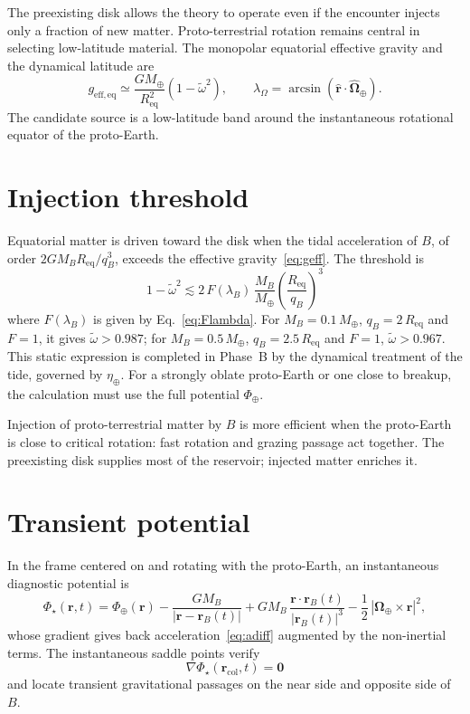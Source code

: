 \documentclass[11pt,a4paper,openany]{report}
\newcommand{\Mt}{M_{\oplus}}
\newcommand{\Req}{R_{\mathrm{eq}}}
\begin{document}
The preexisting disk allows the theory to operate even if the encounter injects only a fraction of
new matter. Proto-terrestrial rotation remains central in selecting low-latitude material. The
monopolar equatorial effective gravity and the dynamical latitude are
\begin{equation}
g_{\mathrm{eff,eq}}\simeq\frac{G\Mt}{\Req^2}\left(1-\tilde\omega^2\right),
\qquad
\lambda_\Omega=\arcsin\!\left(\hat{\mathbf{r}}\cdot\hat{\boldsymbol{\Omega}}_\oplus\right).
\label{eq:geff}
\end{equation}
The candidate source is a low-latitude band around the instantaneous rotational equator of the
proto-Earth.

\section{Injection threshold}

Equatorial matter is driven toward the disk when the tidal acceleration of $B$, of order
$2GM_B\Req/q_B^3$, exceeds the effective gravity~\eqref{eq:geff}. The threshold is
\begin{equation}
\boxed{\;1-\tilde\omega^2\lesssim
2\,F(\lambda_B)\,\frac{M_B}{\Mt}\left(\frac{\Req}{q_B}\right)^3\;}
\label{eq:seuil}
\end{equation}
where $F(\lambda_B)$ is given by Eq.~\eqref{eq:Flambda}. For $M_B=0.1\,\Mt$,
$q_B=2\,\Req$ and $F=1$, it gives $\tilde\omega>0.987$; for $M_B=0.5\,\Mt$,
$q_B=2.5\,\Req$ and $F=1$, $\tilde\omega>0.967$. This static expression is completed in Phase~B by
the dynamical treatment of the tide, governed by $\eta_\oplus$. For a strongly oblate proto-Earth
or one close to breakup, the calculation must use the full potential $\Phi_\oplus$.

\begin{lecture}
Injection of proto-terrestrial matter by $B$ is more efficient when the proto-Earth is close to
critical rotation: fast rotation and grazing passage act together. The preexisting disk supplies
most of the reservoir; injected matter enriches it.
\end{lecture}

\section{Transient potential}

In the frame centered on and rotating with the proto-Earth, an instantaneous diagnostic potential
is
\begin{equation}
\Phi_\star(\mathbf{r},t)=\Phi_\oplus(\mathbf{r})-\frac{GM_B}{|\mathbf{r}-\mathbf{r}_B(t)|}
+GM_B\,\frac{\mathbf{r}\cdot\mathbf{r}_B(t)}{|\mathbf{r}_B(t)|^3}
-\frac12\,|\boldsymbol{\Omega}_\oplus\times\mathbf{r}|^2,
\label{eq:Phistar}
\end{equation}
whose gradient gives back acceleration~\eqref{eq:adiff} augmented by the non-inertial terms. The
instantaneous saddle points verify
\begin{equation}
\nabla\Phi_\star(\mathbf{r}_{\mathrm{col}},t)=\mathbf{0}
\label{eq:col}
\end{equation}
and locate transient gravitational passages on the near side and opposite side of $B$.
\end{document}
